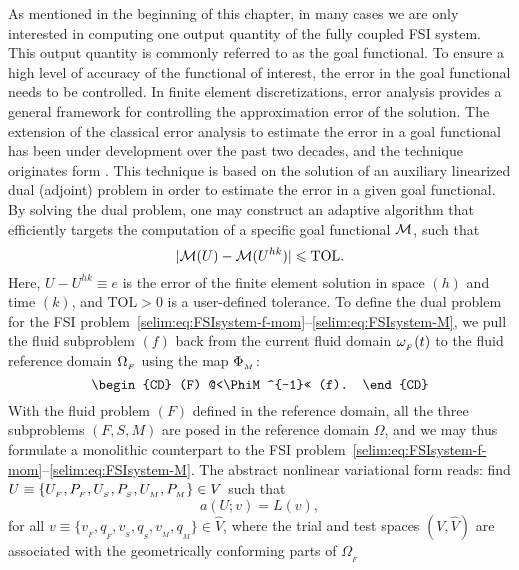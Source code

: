 As mentioned in the beginning of this chapter, in many cases we are
only interested in computing one output quantity of the fully coupled
FSI system. This output quantity is commonly referred to as the goal
functional.  To ensure a high level of accuracy of the functional of
interest, the error in the goal functional needs to be controlled. In
finite element discretizations, \apost{} error analysis
provides a general framework for controlling the approximation error
of the solution.  The extension of the classical \apost{}
error analysis to estimate the error in a goal functional has been
under development over the past two decades, and the technique
originates form \citet{ErikssonEstepEtAl1995,
BeckerRannacher2001}. This technique is based on the solution of an
auxiliary linearized dual (adjoint) problem in order to estimate the
error in a given goal functional. By solving the dual problem, one may
construct an adaptive algorithm that efficiently targets the
computation of a specific goal functional $\mathcal{M}$, such that
\begin{equation}
  \label{selim:eq:goalTOL}
|\mathcal{M}(U)-\mathcal{M}(U^{hk})| \leqslant \mathrm{TOL}.
\end{equation}
Here, $ U-U^{hk} \equiv e$ is the error of the finite element solution
in space $(h)$ and time $(k)$, and $\mathrm{TOL}>0$ is a user-defined
tolerance.  To define the dual problem for the FSI
problem~\eqref{selim:eq:FSIsystem-f-mom}--\eqref{selim:eq:FSIsystem-M}, we pull the fluid subproblem
$(f)$ back from the current fluid domain $\omega_{_{F}}(t)$ to the fluid reference
domain $\Omega_{_{F}}$ using the map $\Phi_{_{M}}$:
\begin{equation}
  \label{selim:eq:pullback}
  \begin{CD}
    (F) @<\PhiM^{-1}<< (f).
  \end{CD}
\end{equation}
With the fluid problem $(F)$ defined in the reference domain, all the
three subproblems $(F,S,M)$ are posed in the reference domain
$\Omega$, and we may thus formulate a monolithic counterpart to the
FSI problem~\eqref{selim:eq:FSIsystem-f-mom}--\eqref{selim:eq:FSIsystem-M}. The abstract nonlinear variational form reads: find $U\equiv \{\UF, \PF, \US, \PS,\break \UM,
P_{_{M}}\}\in V$ such that
\begin{equation}
\label{selim:eq:monolithic}
a(U;v) = L(v),
\end{equation}
for all $v\equiv\{ v_{_{F}}, q_{_{F}}, v_{_{S}}, q_{_{S}}, v_{_{M}}, q_{_{M}}
\}\in\hat{V}$, where the trial and test spaces $(V,\hat{V})$ are
associated with the geometrically conforming parts of $\Omega_{_{F}}$
